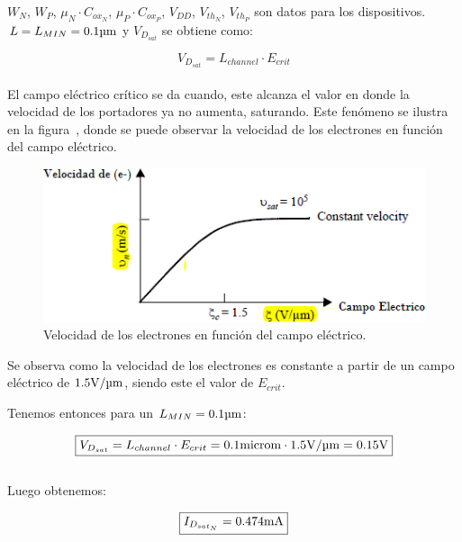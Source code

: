 $W_{N}$, $W_{P}$, $\mu_{N} \cdot C_{ox_{N}}$, $\mu_{P} \cdot C_{ox_{P}}$, $V_{DD}$, $V_{th_{N}}$, $V_{th_{P}}$ son datos para los dispositivos. $L = L_{MIN} = 0.1 \si[per-mode=symbol]{\micro\meter}$ y $V_{D_{sat}}$ se obtiene como:

\begin{equation}
V_{D_{sat}} = L_{channel} \cdot E_{crit}
\end{equation} \\


El campo eléctrico crítico se da cuando, este alcanza el valor en donde la velocidad de los portadores ya no aumenta, saturando. Este fenómeno se ilustra en la figura~, donde se puede observar la velocidad de los electrones en función del campo eléctrico.


\begin{figure}[H] %
\begin{center}
\includegraphics[width=0.7 \textwidth, angle=0]{./img/point1/velocity_saturation}
\caption{\label{fig:fig_carriers_speed_saturation}\footnotesize{Velocidad de los electrones en función del campo eléctrico.}}
\end{center}
\end{figure}

Se observa como la velocidad de los electrones es constante a partir de un campo eléctrico de $1.5 \si[per-mode=symbol]{\volt\per\micro\meter}$, siendo este el valor de $E_{crit}$.

Tenemos entonces para un $L_{MIN} = 0.1 \si[per-mode=symbol]{\micro\meter}$:


\begin{equation*}
\boxed{ V_{D_{sat}} = L_{channel} \cdot E_{crit} = 0.1 \si[per-mode=symbol]{micro\meter} \cdot 1.5 \si[per-mode=symbol]{\volt\per\micro\meter} = 0.15 \si[per-mode=symbol]{\volt} }
\end{equation*} \\

Luego obtenemos:

\begin{equation*}
\boxed{ I_{D_{sat_{N}}} = 0.474 \si[per-mode=symbol]{\milli\ampere} }
\end{equation*}


